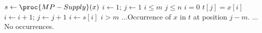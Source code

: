 \begin{codebox}
\li \(s \gets \proc{MP-Supply} (x)\)
\li \(i \gets 1\); \(j \gets 1\)
\li \While \(i \leqslant m\) \LogAnd \(j \leqslant n\)
\li \Do \If \(i = 0\) \LogOr \(t[j] = x[i]\)
\li	  \Then \(i \gets i + 1\); \(j \gets j + 1\)
\li	  \Else \(i \gets s[i]\)
          \End 
    \End
\li \If \(i > m\) 
\li \Then \(\ldots\)\>\>\>\Comment Occurrence of \(x\) in \(t\) at position \(j - m\).
\li \Else \(\ldots\)\>\>\>\Comment No occurrences. 
    \End
\end{codebox}
